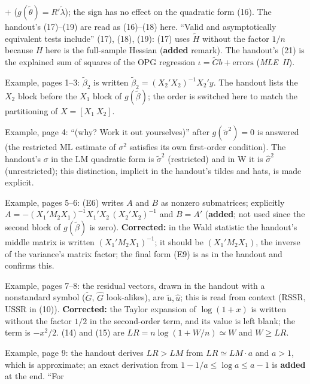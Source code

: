 \documentclass[11pt]{article}
\begin{document}
\begin{transcriptnotes}
       $+$ ($g(\tilde\theta)=R'\tilde\lambda$); the sign has no effect on the quadratic form (16). The handout's
       (17)--(19) are read as (16)--(18) here. ``Valid and asymptotically equivalent tests include'' (17), (18), (19):
       (17) uses $\tilde H$ without the factor $1/n$ because $H$ here is the full-sample Hessian
       (\textbf{added} remark). The handout's (21) is the explained sum of squares of the OPG regression
       $\iota=\tilde Gb+\text{errors}$ (\emph{MLE~II}).
 \item Example, pages 1--3: $\tilde\beta_{2}$ is written $\tilde\beta_{2}=(X_{2}'X_{2})^{-1}X_{2}'y$. The handout lists
       the $X_{2}$ block before the $X_{1}$ block of $g(\tilde\beta)$; the order is switched here to match the
       partitioning of $X=[X_{1}\ X_{2}]$.
 \item Example, page 4: ``(why? Work it out yourselves)'' after $g(\tilde\sigma^{2})=0$ is answered (the
       restricted ML estimate of $\sigma^{2}$ satisfies its own first-order condition). The handout's
       $\sigma$ in the LM quadratic form is $\tilde\sigma^{2}$ (restricted) and in W it is
       $\hat\sigma^{2}$ (unrestricted); this distinction, implicit in the handout's tildes and hats, is
       made explicit.
 \item Example, pages 5--6: (E6) writes $A$ and $B$ as nonzero submatrices; explicitly\\
       $A=-(X_{1}'M_{2}X_{1})^{-1}X_{1}'X_{2}\,(X_{2}'X_{2})^{-1}$ and
       $B=A'$ (\textbf{added}; not used since the
       second block of $g(\tilde\beta)$ is zero). \textbf{Corrected:} in the Wald statistic the handout's middle matrix
       is written $(X_{1}'M_{2}X_{1})^{-1}$; it should be $(X_{1}'M_{2}X_{1})$, the inverse of the variance's
       matrix factor; the final form (E9) is as in the handout and confirms this.
 \item Example, pages 7--8: the residual vectors, drawn in the handout with a nonstandard symbol ($\tilde G$,
       $\hat G$ look-alikes), are $\tilde u,\hat u$; this is read from context (RSSR, USSR in (10)).
       \textbf{Corrected:} the Taylor expansion of $\log(1+x)$ is written without the factor $1/2$ in the second-order
       term, and its value is left blank; the term is $-x^{2}/2$. (14) and (15) are
       $LR=n\log(1+W/n)\simeq W$ and $W\ge LR$.
 \item Example, page 9: the handout derives $LR>LM$ from $LR\simeq LM\cdot a$ and $a>1$, which is
       approximate; an exact derivation from $1-1/a\le\log a\le a-1$ is \textbf{added} at the end. ``For

\end{transcriptnotes}
\end{document}
